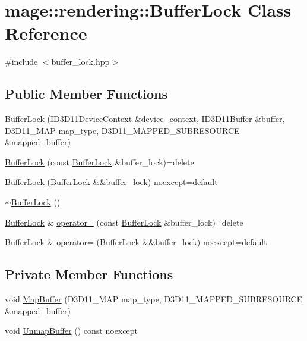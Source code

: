 \hypertarget{classmage_1_1rendering_1_1_buffer_lock}{}\section{mage\+:\+:rendering\+:\+:Buffer\+Lock Class Reference}
\label{classmage_1_1rendering_1_1_buffer_lock}


{\ttfamily \#include $<$buffer\+\_\+lock.\+hpp$>$}

\subsection*{Public Member Functions}
\begin{DoxyCompactItemize}
\item 
\mbox{\hyperlink{classmage_1_1rendering_1_1_buffer_lock_a548c15e53e0903471268c83f16126f43}{Buffer\+Lock}} (I\+D3\+D11\+Device\+Context \&device\+\_\+context, I\+D3\+D11\+Buffer \&buffer, D3\+D11\+\_\+\+M\+AP map\+\_\+type, D3\+D11\+\_\+\+M\+A\+P\+P\+E\+D\+\_\+\+S\+U\+B\+R\+E\+S\+O\+U\+R\+CE \&mapped\+\_\+buffer)
\item 
\mbox{\hyperlink{classmage_1_1rendering_1_1_buffer_lock_a8804d6bd8626c71aac68bf9a5cf4c1f3}{Buffer\+Lock}} (const \mbox{\hyperlink{classmage_1_1rendering_1_1_buffer_lock}{Buffer\+Lock}} \&buffer\+\_\+lock)=delete
\item 
\mbox{\hyperlink{classmage_1_1rendering_1_1_buffer_lock_ad1f7ea416870a58043c505404115327e}{Buffer\+Lock}} (\mbox{\hyperlink{classmage_1_1rendering_1_1_buffer_lock}{Buffer\+Lock}} \&\&buffer\+\_\+lock) noexcept=default
\item 
\mbox{\hyperlink{classmage_1_1rendering_1_1_buffer_lock_ae7ce340c09dc0698aedf33aeb66b14c6}{$\sim$\+Buffer\+Lock}} ()
\item 
\mbox{\hyperlink{classmage_1_1rendering_1_1_buffer_lock}{Buffer\+Lock}} \& \mbox{\hyperlink{classmage_1_1rendering_1_1_buffer_lock_ae246c49ce47dbff7ac9f08e309e90339}{operator=}} (const \mbox{\hyperlink{classmage_1_1rendering_1_1_buffer_lock}{Buffer\+Lock}} \&buffer\+\_\+lock)=delete
\item 
\mbox{\hyperlink{classmage_1_1rendering_1_1_buffer_lock}{Buffer\+Lock}} \& \mbox{\hyperlink{classmage_1_1rendering_1_1_buffer_lock_a625ec83f70daddaedc2cb0533b982c74}{operator=}} (\mbox{\hyperlink{classmage_1_1rendering_1_1_buffer_lock}{Buffer\+Lock}} \&\&buffer\+\_\+lock) noexcept=default
\end{DoxyCompactItemize}
\subsection*{Private Member Functions}
\begin{DoxyCompactItemize}
\item 
void \mbox{\hyperlink{classmage_1_1rendering_1_1_buffer_lock_a88693ae3717c7098d5cc2313cd16b8a6}{Map\+Buffer}} (D3\+D11\+\_\+\+M\+AP map\+\_\+type, D3\+D11\+\_\+\+M\+A\+P\+P\+E\+D\+\_\+\+S\+U\+B\+R\+E\+S\+O\+U\+R\+CE \&mapped\+\_\+buffer)
\item 
void \mbox{\hyperlink{classmage_1_1rendering_1_1_buffer_lock_a19ebd740876eea3b7d418bef505c47d7}{Unmap\+Buffer}} () const noexcept
\end{DoxyCompactItemize}

